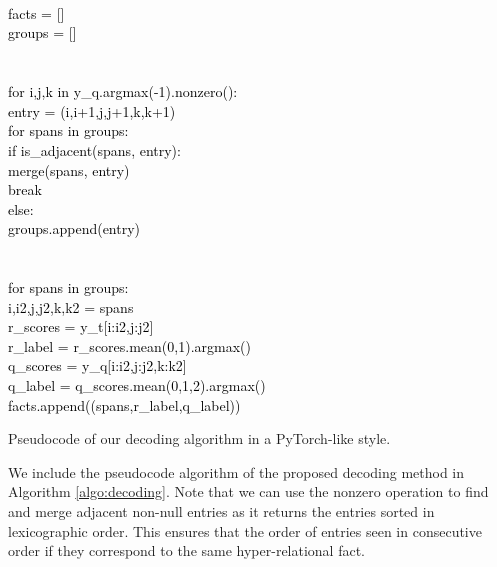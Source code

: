 \documentclass[11pt]{article}
\newcommand{\PyCode}[1]{\ttfamily\textcolor{black}{#1}}
\begin{document}
\begin{algorithm}
\small
\SetAlgoLined
{} \\
 \\
\PyCode{} \\
\PyCode{facts = []}  \\
\PyCode{groups = []}  \\
\PyCode{} \\
 \\
\PyCode{for i,j,k in y\_q.argmax(-1).nonzero():}  \\
\Indp   \PyCode{entry = (i,i+1,j,j+1,k,k+1)} \\
    \PyCode{for spans in groups:} \\
    \Indp
        \PyCode{if is\_adjacent(spans, entry):} \\
        \Indp
            \PyCode{merge(spans, entry)} \\
            \PyCode{break} \\
        \Indm
    \Indm
    \PyCode{else:} \\
    \Indp
        \PyCode{groups.append(entry)} \\
    \Indm
\Indm 
\PyCode{} \\
 \\
\PyCode{for spans in groups:} \\
\Indp
    \PyCode{i,i2,j,j2,k,k2 = spans} \\
    \PyCode{r\_scores = y\_t[i:i2,j:j2]} \\
    \PyCode{r\_label = r\_scores.mean(0,1).argmax()} \\
    \PyCode{q\_scores = y\_q[i:i2,j:j2,k:k2]} \\
    \PyCode{q\_label = q\_scores.mean(0,1,2).argmax()} \\
    \PyCode{facts.append((spans,r\_label,q\_label))} \\
\Indm
\caption{
Pseudocode of our decoding algorithm in a PyTorch-like style.
}
\label{algo:decoding}
\end{algorithm}

We include the pseudocode algorithm of the proposed decoding method in Algorithm \ref{algo:decoding}.
Note that we can use the nonzero operation to find and merge adjacent non-null entries as it returns the entries sorted in lexicographic order.
This ensures that the order of entries seen in consecutive order if they correspond to the same hyper-relational fact.
\end{document}
